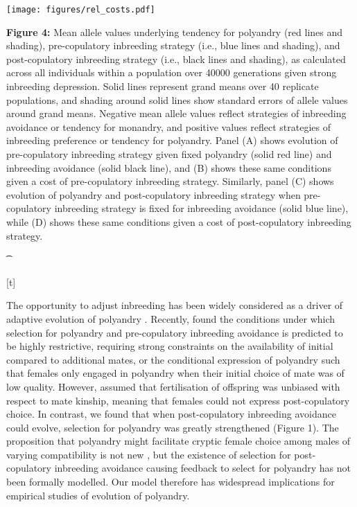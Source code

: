 \documentclass[10pt,letterpaper]{article}
\begin{document}
{\color{Gray}
\begin{adjustwidth}{-2.5in}{0in}
{%
   \texttt{[image: figures/rel\_costs.pdf]}%
}%
{%
   \begin{justify}\vspace{0.25 mm} \textbf{Figure 4:} Mean allele values underlying tendency for polyandry (red lines and shading), pre-copulatory inbreeding strategy (i.e., blue lines and shading), and post-copulatory inbreeding strategy (i.e., black lines and shading), as calculated across all individuals within a population over 40000 generations given strong inbreeding depression. Solid lines represent grand means over 40 replicate populations, and shading around solid lines show standard errors of allele values around grand means. Negative mean allele values reflect strategies of inbreeding avoidance or tendency for monandry, and positive values reflect strategies of inbreeding preference or tendency for polyandry. Panel (A) shows evolution of pre-copulatory inbreeding strategy given fixed polyandry (solid red line) and inbreeding avoidance (solid black line), and (B) shows these same conditions given a cost of pre-copulatory inbreeding strategy. Similarly, panel (C) shows evolution of polyandry and post-copulatory inbreeding strategy when pre-copulatory inbreeding strategy is fixed for inbreeding avoidance (solid blue line), while (D) shows these same conditions given a cost of post-copulatory inbreeding strategy.\end{justify}{\t}%
}[t]
\end{adjustwidth}
}

The opportunity to adjust inbreeding has been widely considered as a driver of adaptive evolution of polyandry \cite[][]{Tregenza2002, Foerster2003, Akcay2007, Varian-Ramos2012, Kingma2013, Lehtonen2015, Reid2014}. Recently, \cite{Duthie} found the conditions under which selection for polyandry and pre-copulatory inbreeding avoidance is predicted to be highly restrictive, requiring strong constraints on the availability of initial compared to additional mates, or the conditional expression of polyandry such that females only engaged in polyandry when their initial choice of mate was of low quality. However, \cite{Duthie} assumed that fertilisation of offspring was unbiased with respect to mate kinship, meaning that females could not express post-copulatory choice. In contrast, we found that when post-copulatory inbreeding avoidance could evolve, selection for polyandry was greatly strengthened (Figure 1). The proposition that polyandry might facilitate cryptic female choice among males of varying compatibility is not new \cite[e.g.,][]{Zeh1997}, but the existence of selection for post-copulatory inbreeding avoidance causing feedback to select for polyandry has not been formally modelled. Our model therefore has widespread implications for empirical studies of evolution of polyandry. 
\end{document}
